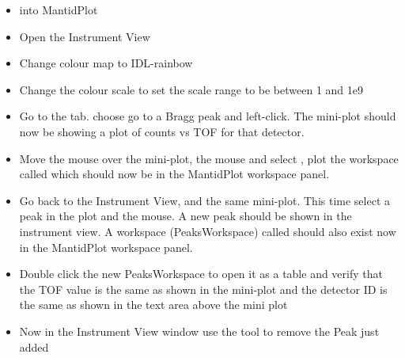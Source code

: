 \documentclass[letterpaper,10pt,english,openany]{sphinxmanual}
\let\sphinxpxdimen\pdfpxdimen\else\newdimen\sphinxpxdimen
\begin{document}
\label{\detokenize{mantid_basic_course/connecting_data_to_instruments/06_exercises_c:exercise-1}}\begin{itemize}
\item {} 
  into MantidPlot

\item {} 
Open the Instrument View

\item {} 
Change colour map to IDL-rainbow

\item {} 
Change the colour scale to  set the scale range to be between
1 and 1e9

\item {} 
Go to the  tab. choose 
 go to a Bragg peak and left-click. The
mini-plot should now be showing a plot of counts vs TOF for that
detector.

\item {} 
Move the mouse over the mini-plot,  the mouse and
select , plot the workspace called 
which should now be in the MantidPlot workspace panel.

\item {} 
Go back to the Instrument View, and the same mini-plot. This time
select a peak in the plot and  the mouse. A new peak
should be shown in the instrument view. A workspace (PeaksWorkspace)
called  should also exist now in the
MantidPlot workspace panel.
\sphinxincludegraphics[width=600\sphinxpxdimen]{{MBC_PickDemo}.png}

\item {} 
Double click the new PeaksWorkspace to open it as a table and verify
that the TOF value is the same as shown in the mini-plot and the
detector ID is the same as shown in the text area above the mini plot

\item {} 
Now in the Instrument View window use the   tool to remove the Peak just added

\end{itemize}
\end{document}
